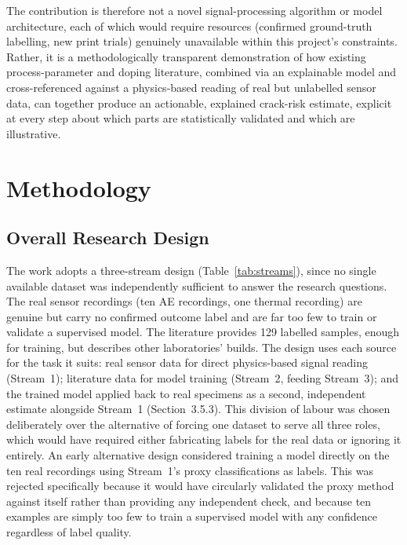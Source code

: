 \documentclass[a4paper]{article}
\begin{document}
The contribution is therefore not a novel signal-processing algorithm or model architecture, each of which would require resources (confirmed ground-truth labelling, new print trials) genuinely unavailable within this project's constraints. Rather, it is a methodologically transparent demonstration of how existing process-parameter and doping literature, combined via an explainable model and cross-referenced against a physics-based reading of real but unlabelled sensor data, can together produce an actionable, explained crack-risk estimate, explicit at every step about which parts are statistically validated and which are illustrative.

\section{Methodology}
\subsection{Overall Research Design}
The work adopts a three-stream design (Table~\ref{tab:streams}), since no single available dataset was independently sufficient to answer the research questions. The real sensor recordings (ten AE recordings, one thermal recording) are genuine but carry no confirmed outcome label and are far too few to train or validate a supervised model. The literature provides 129 labelled samples, enough for training, but describes other laboratories' builds. The design uses each source for the task it suits: real sensor data for direct physics-based signal reading (Stream~1); literature data for model training (Stream~2, feeding Stream~3); and the trained model applied back to real specimens as a second, independent estimate alongside Stream~1 (Section~3.5.3). This division of labour was chosen deliberately over the alternative of forcing one dataset to serve all three roles, which would have required either fabricating labels for the real data or ignoring it entirely. An early alternative design considered training a model directly on the ten real recordings using Stream~1's proxy classifications as labels. This was rejected specifically because it would have circularly validated the proxy method against itself rather than providing any independent check, and because ten examples are simply too few to train a supervised model with any confidence regardless of label quality.
\end{document}
